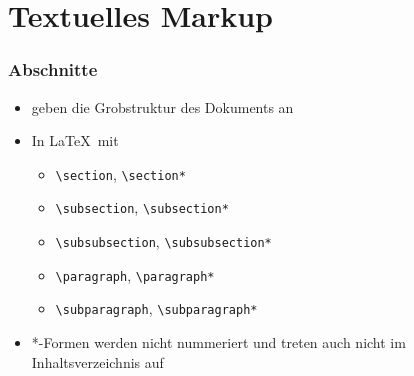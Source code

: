 \section{Textuelles Markup}

\begin{frame}[fragile]
  \frametitle{Abschnitte}

  \begin{itemize}
  \item<+-> geben die Grobstruktur des Dokuments an
  \item<+-> In \LaTeX\ mit
    \begin{itemize}
    \item \lstinline!\section!, \lstinline!\section*!
    \item \lstinline!\subsection!, \lstinline!\subsection*!
    \item \lstinline!\subsubsection!, \lstinline!\subsubsection*!
    \item \lstinline!\paragraph!, \lstinline!\paragraph*!
    \item \lstinline!\subparagraph!, \lstinline!\subparagraph*!
    \end{itemize}
  \item<+-> *-Formen werden nicht nummeriert und treten auch nicht im
    Inhaltsverzeichnis auf

\end{itemize}
\end{frame}
